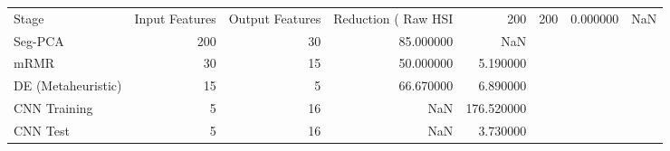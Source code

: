 \begin{tabular}{lrrrr}
\toprule
Stage & Input Features & Output Features & Reduction (%
\midrule
Raw HSI & 200 & 200 & 0.000000 & NaN \\
Seg-PCA & 200 & 30 & 85.000000 & NaN \\
mRMR & 30 & 15 & 50.000000 & 5.190000 \\
DE (Metaheuristic) & 15 & 5 & 66.670000 & 6.890000 \\
CNN Training & 5 & 16 & NaN & 176.520000 \\
CNN Test & 5 & 16 & NaN & 3.730000 \\
\bottomrule
\end{tabular}
